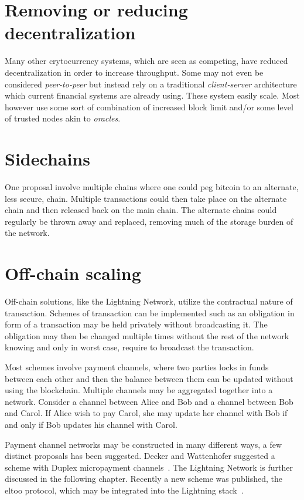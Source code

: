\section{Removing or reducing decentralization}

Many other crytocurrency systems, which are seen as competing, have reduced decentralization in order to increase throughput. Some may not even be considered \textit{peer-to-peer} but instead rely on a traditional \textit{client-server} architecture which current financial systems are already using. These system easily scale. Most however use some sort of combination of increased block limit and/or some level of trusted \gls{node}s akin to \textit{oracles}.  

\section{Sidechains}

One proposal involve multiple chains where one could peg bitcoin to an alternate, less secure, chain. Multiple transactions could then take place on the alternate chain and then released back on the main chain. The alternate chains could regularly be thrown away and replaced, removing much of the storage burden of the network.~\cite{blockstream:sidechain}

\section{Off-chain scaling}

Off-chain solutions, like the \gls{Lightning Network}, utilize the contractual nature of transaction. Schemes of transaction can be implemented such as an obligation in form of a transaction may be held privately without broadcasting it. The obligation may then be changed multiple times without the rest of the network knowing and only in worst case, require to broadcast the transaction. 

Most schemes involve payment channels, where two parties locks in funds between each other and then the balance between them can be updated without using the blockchain. Multiple channels may be aggregated together into a network. Consider a channel between Alice and Bob and a channel between Bob and Carol. If Alice wish to pay Carol, she may update her channel with Bob if and only if Bob updates his channel with Carol.  

Payment channel networks may be constructed in many different ways, a few distinct proposals has been suggested. Decker and Wattenhofer suggested a scheme with Duplex micropayment channels~\cite{decker:wattenhofer:duplex}. The \gls{Lightning Network} is further discussed in the following chapter. Recently a new scheme was published, the eltoo protocol, which may be integrated into the Lightning stack~\cite{decker:russell:Osuntokun:eltoo}.   


